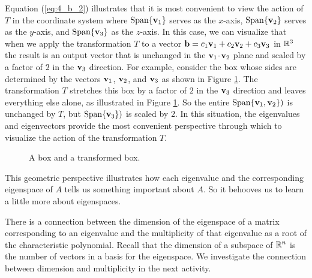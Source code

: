 Equation (\ref{eq:4_b_2}) illustrates that it is most convenient to view the action of $T$ in the coordinate system where $\text{Span} \{\mathbf{v}_1\}$ serves as the $x$-axis, $\text{Span} \{\mathbf{v}_2\}$ serves as the $y$-axis, and $\text{Span} \{\mathbf{v}_3\}$ as the $z$-axis. In this case, we can visualize that when we apply the transformation $T$ to a vector $\mathbf{b} = c_1 \mathbf{v}_1 + c_2 \mathbf{v}_2 + c_3 \mathbf{v}_3$ in $\mathbb{R}^3$ the result is an output vector that is unchanged in the $\mathbf{v}_1$-$\mathbf{v}_2$ plane and scaled by a factor of $2$ in the $\mathbf{v}_3$ direction. For example, consider the box whose sides are determined by the vectors $\mathbf{v}_1$, $\mathbf{v}_2$, and $\mathbf{v}_3$ as shown in Figure \ref{F:4_b_1}. The transformation $T$ stretches this box by a factor of $2$ in the $\mathbf{v}_3$ direction and leaves everything else alone, as illustrated in Figure \ref{F:4_b_1}. So the entire $\text{Span} \{\mathbf{v}_1, \mathbf{v}_2\})$ is unchanged by $T$, but $\text{Span} \{\mathbf{v}_3\})$ is scaled by $2$. In this situation, the eigenvalues and eigenvectors provide the most convenient perspective through which to visualize the action of the transformation $T$. 
\begin{figure}[ht]
\begin{center}
\end{center}
\caption{A box and a transformed box.}
\label{F:4_b_1}
\end{figure}

This geometric perspective illustrates how each eigenvalue and the corresponding eigenspace of $A$ tells us something important about $A$. So it behooves us to learn a little more about eigenspaces. 



There is a connection between the dimension of the eigenspace of a matrix corresponding to an eigenvalue and the multiplicity of that eigenvalue as a root of the characteristic polynomial. Recall that the dimension of a subspace of $\mathbb{R}^n$ is the number of vectors in a basis for the eigenspace. We investigate the connection between dimension and multiplicity in the next activity.



